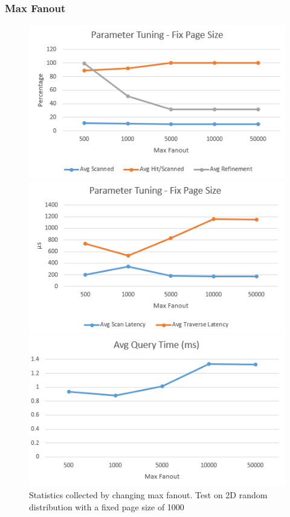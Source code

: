 \documentclass[sigconf,10pt]{acmart}
\begin{document}
\subsubsection{Max Fanout}

\begin{figure}[ht] 
  \label{parameter-fix-pageSize} 
  \begin{minipage}[b]{0.33\linewidth}
    \centering
    \includegraphics[width=.8\linewidth]{../figures/parameter/fix-pagesize-hit} 
    \vspace{4ex}
  \end{minipage}%
  \begin{minipage}[b]{0.33\linewidth}
    \centering
    \includegraphics[width=.8\linewidth]{../figures/parameter/fix-pagesize-latency} 
    \vspace{4ex}
  \end{minipage}%
  \begin{minipage}[b]{0.33\linewidth}
    \centering
    \includegraphics[width=.8\linewidth]{../figures/parameter/fix-pagesize-qtime} 
    \vspace{4ex}
  \end{minipage}
  \caption{Statistics collected by changing max fanout. Test on 2D random distribution
  with a fixed page size of 1000}
\end{figure}
\end{document}
